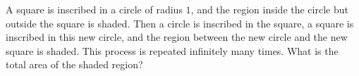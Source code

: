 A square is inscribed in a circle of radius $1$, and the region inside the circle but outside the square is shaded. Then a circle is inscribed in the square, a square is inscribed in this new circle, and the region between the new circle and the new square is shaded. This process is repeated infinitely many times. What is the total area of the shaded region?
